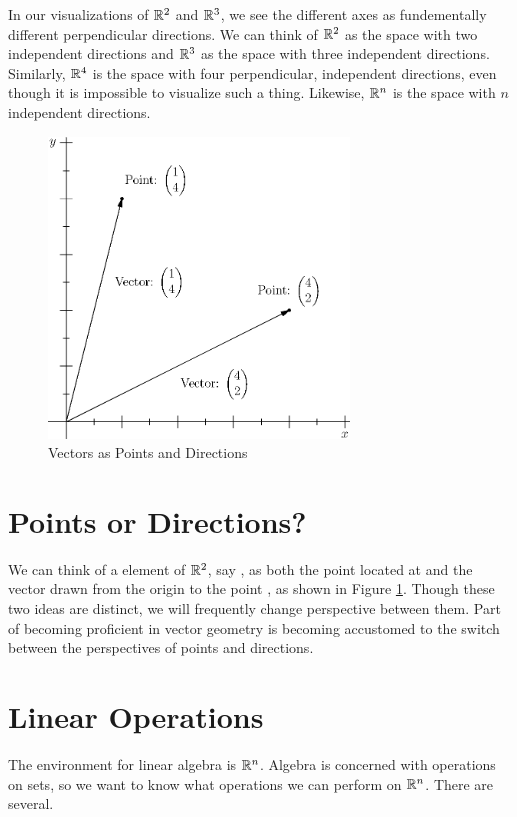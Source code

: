 \documentclass[fleqn]{report}
\begin{document}
In our visualizations of $\mathbb{R}^2$ and
$\mathbb{R}^3$, we see the different axes as fundementally
different perpendicular directions. We can think of $\mathbb{R}^2$ as
the space with two independent directions and $\mathbb{R}^3$ as the
space with three independent directions. Similarly, $\mathbb{R}^4$ is
the space with four perpendicular, independent directions, even
though it is impossible to visualize such a thing. 
Likewise, $\mathbb{R}^n$ is the space with $n$ independent directions. 

\begin{figure}[t]
\centering
\includegraphics[width=8cm]{figure3.eps}
\caption{Vectors as Points and Directions}
\label{Points and Directions}
\end{figure}

\section{Points or Directions?}

We can think of a element of $\mathbb{R}^2$, say
, as both the point located
at  and the vector drawn
from the origin to the point
, as shown in Figure
\ref{Points and Directions}. Though these two ideas are
distinct, we will frequently change perspective between them.
Part of becoming proficient in vector geometry is becoming
accustomed to the switch between the perspectives of points
and directions.

\section{Linear Operations}

The environment for linear algebra is $\mathbb{R}^n$. Algebra is
concerned with operations on sets, so we want to know what
operations we can perform on $\mathbb{R}^n$. There are several.
\end{document}

